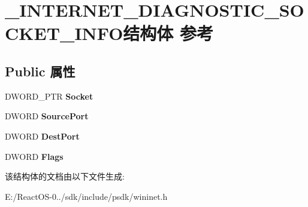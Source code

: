 \hypertarget{struct___i_n_t_e_r_n_e_t___d_i_a_g_n_o_s_t_i_c___s_o_c_k_e_t___i_n_f_o}{}\section{\+\_\+\+I\+N\+T\+E\+R\+N\+E\+T\+\_\+\+D\+I\+A\+G\+N\+O\+S\+T\+I\+C\+\_\+\+S\+O\+C\+K\+E\+T\+\_\+\+I\+N\+F\+O结构体 参考}
\label{struct___i_n_t_e_r_n_e_t___d_i_a_g_n_o_s_t_i_c___s_o_c_k_e_t___i_n_f_o}
\subsection*{Public 属性}
\begin{DoxyCompactItemize}
\item 
\mbox{\label{struct___i_n_t_e_r_n_e_t___d_i_a_g_n_o_s_t_i_c___s_o_c_k_e_t___i_n_f_o_a4b5b5b5476a469a6e366e12adce8602f}} 
D\+W\+O\+R\+D\+\_\+\+P\+TR {\bfseries Socket}
\item 
\mbox{\label{struct___i_n_t_e_r_n_e_t___d_i_a_g_n_o_s_t_i_c___s_o_c_k_e_t___i_n_f_o_a257709fd5b5817935eb99fdf6c13fac7}} 
D\+W\+O\+RD {\bfseries Source\+Port}
\item 
\mbox{\label{struct___i_n_t_e_r_n_e_t___d_i_a_g_n_o_s_t_i_c___s_o_c_k_e_t___i_n_f_o_abe3635474be421e9a817c8188cf2d469}} 
D\+W\+O\+RD {\bfseries Dest\+Port}
\item 
\mbox{\label{struct___i_n_t_e_r_n_e_t___d_i_a_g_n_o_s_t_i_c___s_o_c_k_e_t___i_n_f_o_a4c791ba52e328b04db1978934c41b60e}} 
D\+W\+O\+RD {\bfseries Flags}
\end{DoxyCompactItemize}


该结构体的文档由以下文件生成\+:\begin{DoxyCompactItemize}
\item 
E\+:/\+React\+O\+S-\/0../sdk/include/psdk/wininet.\+h\end{DoxyCompactItemize}
